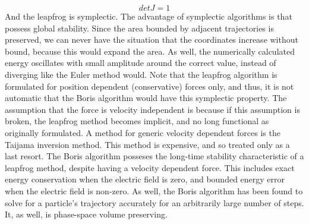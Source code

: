 \documentclass[12pt]{article}
\begin{document}
$$detJ=1$$
And the leapfrog is symplectic. The advantage of symplectic algorithms is that possess global stability. Since the area bounded by adjacent trajectories is preserved, we can never have the situation that the coordinates increase without bound, because this would expand the area. As well, the numerically calculated energy oscillates with small amplitude around the correct value, instead of diverging like the Euler method would. Note that the leapfrog algorithm is formulated for position dependent (conservative) forces only, and thus, it is not automatic that the Boris algorithm would have this symplectic property. The assumption that the force is velocity independent is because if this assumption is broken, the leapfrog method becomes implicit, and no long functional as originally formulated. A method for generic velocity dependent forces is the Taijama inversion method. This method is expensive, and so treated only as a last resort. The Boris algorithm posseses the long-time stability characteristic of a leapfrog method, despite having a velocity dependent force. This includes exact energy conservation when the electric field is zero, and bounded energy error when the electric field is non-zero\cite{PPPLReport}. As well, the Boris algorithm has been found to solve for a particle's trajectory accurately for an arbitrarily large number of steps\cite{PPPLReport}. It, as well, is phase-space volume preserving. 
\end{document}
